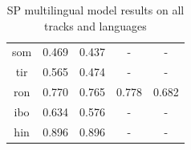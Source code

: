 \documentclass[11pt]{article}
\begin{document}
\begin{table}[]
\begin{tabular}{ccccc}
{\color[HTML]{212121} som}          & {\color[HTML]{212121} 0.469} & {\color[HTML]{212121} 0.437} & -                            & -                            \\
{\color[HTML]{212121} tir}          & {\color[HTML]{212121} 0.565} & {\color[HTML]{212121} 0.474} & -                            & -                            \\
{\color[HTML]{212121} ron}          & {\color[HTML]{212121} 0.770} & {\color[HTML]{212121} 0.765} & {\color[HTML]{212121} 0.778} & {\color[HTML]{212121} 0.682} \\
{\color[HTML]{212121} ibo}          & {\color[HTML]{212121} 0.634} & {\color[HTML]{212121} 0.576} & -                            & -                            \\
{\color[HTML]{212121} hin}          & {\color[HTML]{212121} 0.896} & {\color[HTML]{212121} 0.896} & -                            & -                            \\ \hline
\end{tabular}
\caption{SP multilingual model results on all tracks and languages}
\label{tab:SP_Multilingual}
\end{table}
\end{document}
